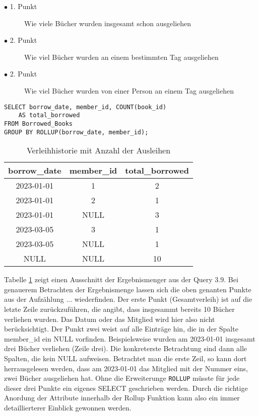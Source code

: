 \begin{description}
	\item[$\bullet$ 1. Punkt] Wie viele Bücher wurden insgesamt schon ausgeliehen

	\item[$\bullet$ 2. Punkt] Wie viel Bücher wurden an einem bestimmten Tag ausgeliehen

	\item[$\bullet$ 2. Punkt] Wie viel Bücher wurden von einer Person an einem Tag
		ausgeliehen
\end{description}

\begin{lstlisting}
SELECT borrow_date, member_id, COUNT(book_id)
	AS total_borrowed
FROM Borrowed_Books
GROUP BY ROLLUP(borrow_date, member_id);
\end{lstlisting}

\begin{table}[h]
	\centering
	\begin{tabular}{|c|c|c|}
		\hline
		\textbf{borrow\_date} & \textbf{member\_id} & \textbf{total\_borrowed} \\
		\hline
		2023-01-01            & 1                   & 2                        \\ %
		\hline
		2023-01-01            & 2                   & 1                        \\ %
		\hline
		2023-01-01            & NULL                & 3                        \\ %
		\hline
		2023-03-05            & 3                   & 1                        \\
		\hline
		2023-03-05            & NULL                & 1                        \\
		\hline
		NULL                  & NULL                & 10                       \\
		\hline
	\end{tabular}
	\caption{Verleihhistorie mit Anzahl der Ausleihen}
	\label{tab:borrow_history}
\end{table}

Tabelle \ref{tab:borrow_history} zeigt einen Ausschnitt der Ergebnismenger aus
der Query 3.9. Bei genauerem Betrachten der Ergebnismenge lassen sich die oben genanten
Punkte aus der Aufzählung ... wiederfinden. Der erste Punkt (Gesamtverleih) ist
auf die letzte Zeile zurückzuführen, die angibt, dass insgesammt bereits 10
Bücher verliehen wurden. Das Datum oder das Mitglied wird hier also nicht berücksichtigt.
Der Punkt zwei weist auf alle Einträge hin, die in der Spalte member\_id ein NULL
vorfinden. Beispielsweise wurden am 2023-01-01 insgesamt drei Bücher verliehen (Zeile
drei). Die konkreterste Betrachtung sind dann alle Spalten, die kein NULL
aufweisen. Betrachtet man die erste Zeil, so kann dort herrausgelesen werden, dass
am 2023-01-01 das Mitglied mit der Nummer eins, zwei Bücher ausgeliehen hat. Ohne
die Erweiterunge \texttt{ROLLUP} müsste für jede dieser drei Punkte ein eigenes
SELECT geschrieben werden. Durch die richtige Anordung der Attribute innerhalb der
Rollup Funktion kann also ein immer detaillierterer Einblick gewonnen werden.

